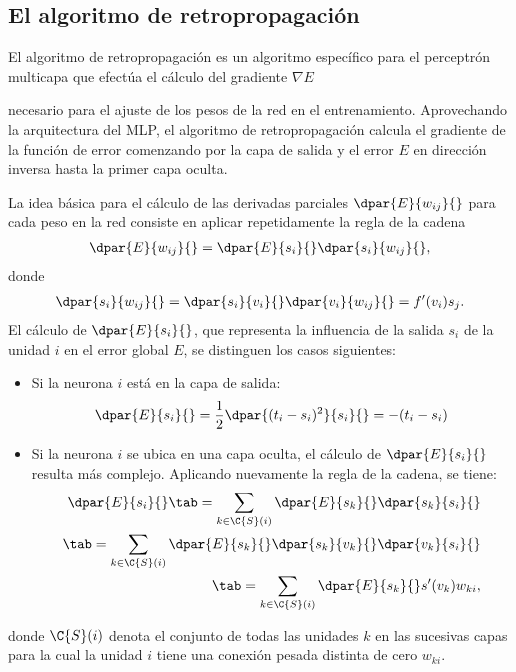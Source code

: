 %
%
\subsection{El algoritmo de retropropagación}
%
El algoritmo de retropropagación es un algoritmo específico para el
perceptrón multicapa que efectúa el cálculo del gradiente $\nabla E$

necesario para el ajuste de los pesos de la red en el entrenamiento.
Aprovechando la arquitectura del MLP, el algoritmo de retropropagación
calcula el gradiente de la función de error comenzando por la capa de
salida y  el error $E$ en dirección inversa hasta la
primer capa oculta.

La idea básica para el cálculo de las derivadas parciales
$\dpar{E}{w_{ij}}{}$ para cada peso en la red consiste en aplicar
repetidamente la regla de la cadena
%
\begin{align}\label{e2:deriv-E-wrt-w}
  \dpar{E}{w_{ij}}{} = \dpar{E}{s_{i}}{}\dpar{s_i}{w_{ij}}{},
\end{align}
%
donde
%
\begin{align}\label{e2:deriv-s-wrt-w}
  \dpar{s_i}{w_{ij}}{} = \dpar{s_i}{v_{i}}{}\dpar{v_i}{w_{ij}}{} =
  f'(v_i) s_j .
\end{align}
%
El cálculo de $\dpar{E}{s_i}{}$, que representa la influencia
de la salida $s_i$ de la unidad $i$ en el error global $E$,
se distinguen los casos siguientes:
%
\begin{itemize}
\item Si la neurona $i$ está en la capa de salida:
  \begin{align}\label{e2:deriv-E-wrt-s-out} %
    \dpar{E}{s_i}{}=\frac{1}{2}\dpar{(t_i-s_i)^2}{s_i}{}=-(t_i-s_i)
  \end{align}
\item Si la neurona $i$ se ubica en una capa oculta, el cálculo de
  $\dpar{E}{s_i}{}$ resulta más complejo. Aplicando nuevamente la
  regla de la cadena, se tiene:
  \begin{align}\label{e2:deriv-E-wrt-s-hid} %
    \dpar{E}{s_i}{} \tab= \sum_{k\in\C{S}(i)}
      \dpar{E}{s_k}{}\dpar{s_k}{s_i}{} \notag\\
    \tab= \sum_{k\in\C{S}(i)}
      \dpar{E}{s_k}{}\dpar{s_k}{v_k}{}\dpar{v_k}{s_i}{} \notag\\
    \tab= \sum_{k\in\C{S}(i)} \dpar{E}{s_k}{} s'(v_k) w_{ki},
  \end{align}
\end{itemize}
donde $\C{S}(i)$ denota el conjunto de todas las unidades $k$ en las
sucesivas capas para la cual la unidad $i$ tiene una conexión
pesada distinta de cero $w_{ki}$.

